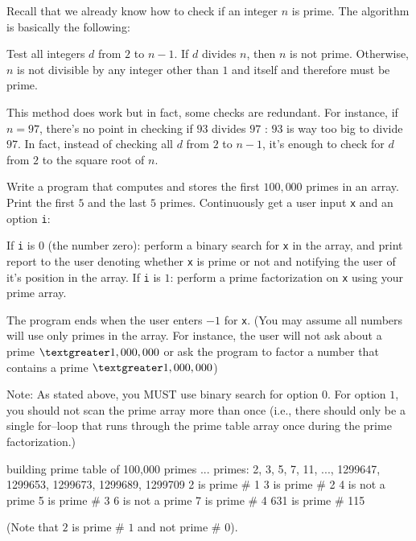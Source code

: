 Recall that we already know how to check if an integer $n$ is prime. The
algorithm is basically the following: 
\begin{tightlist}
  \li Test all integers $d$ from $2$ to $n - 1$.
  \li If $d$ divides $n$, then $n$ is not prime.
  \li Otherwise, $n$ is not divisible by any integer other than $1$ and
itself and therefore must be prime.
\end{tightlist}

This method does work but in fact, some checks are redundant. For instance, if
$n = 97$, there's no point in checking if $93$ divides $97$ : $93$ is way too
big to divide $97$. In fact, instead of checking all $d$ from $2$ to $n - 1$,
it's enough to check for $d$ from $2$ to the square root of $n$.

Write a program that computes and stores the first $100,000$ primes in an
array. Print the first $5$ and the last $5$ primes. Continuously get a user
input \verb!x! and an option \verb!i!:

\begin{itemize}
  \li If \verb!i! is $0$ (the number zero): perform a binary search for
      \verb!x! in the array, and print report to the user denoting whether
      \verb!x! is prime or not and notifying the user of it's position in the
      array.
  \li If \verb!i! is $1$: perform a prime factorization on \verb!x! using your
      prime array.
\end{itemize}

The program ends when the user enters $-1$ for \verb!x!. (You may assume all
numbers will use only primes in the array. For instance, the user will not ask
about a prime $\textgreater 1,000,000$ or ask the program to factor a number
that contains a prime $\textgreater 1,000,000$)

Note:
As stated above, you MUST use binary search for option $0$.
For option $1$, you should not scan the prime array more than once (i.e., there
should only be a single for--loop that runs through the prime table array once
during the prime factorization.) 

\resett
\nextt
\begin{console}[fontsize=\small,frame=single, commandchars=\\\{\}]
building prime table of 100,000 primes ...
primes: 2, 3, 5, 7, 11, ..., 1299647, 1299653, 1299673, 1299689, 1299709
2 is prime # 1
3 is prime # 2
4 is not a prime
5 is prime # 3
6 is not a prime
7 is prime # 4
631 is prime # 115
\end{console}
(Note that $2$ is prime \# $1$ and not prime \# $0$).

